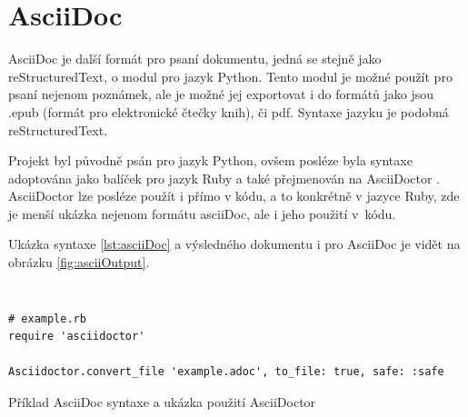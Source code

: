 \clearpage

\section{AsciiDoc}

AsciiDoc je další formát pro psaní dokumentu, jedná se stejně jako reStructuredText, o modul pro jazyk Python. Tento modul je možné použít pro psaní nejenom poznámek,
ale je možné jej exportovat i do formátů jako jsou .epub (formát pro elektronické čtečky knih), či \gls{pdf}. \cite{asciiDoc} Syntaxe jazyku je podobná reStructuredText.

Projekt byl původně psán pro jazyk Python, ovšem posléze byla syntaxe adoptována jako balíček pro jazyk Ruby a také přejmenován na AsciiDoctor \cite{asciiDoctorSW}. AsciiDoctor lze posléze
použít i přímo v kódu, a to konkrétně v jazyce Ruby, zde je menší ukázka nejenom formátu asciiDoc, ale i jeho použití v~kódu.

Ukázka syntaxe \ref{lst:asciiDoc} a výsledného dokumentu i pro AsciiDoc je vidět na obrázku \ref{fig:asciiOutput}.

\begin{listing}[ht]
    \inputminted[linenos,breaklines]{text}{example-ascii.adoc}
    \inputminted[linenos,breaklines]{text}{module.adoc}
    \begin{verbatim}
# example.rb
require 'asciidoctor'

Asciidoctor.convert_file 'example.adoc', to_file: true, safe: :safe
    \end{verbatim}
    \caption{Příklad AsciiDoc syntaxe a ukázka použití AsciiDoctor}
    \label{lst:asciiDoc}
\end{listing}


